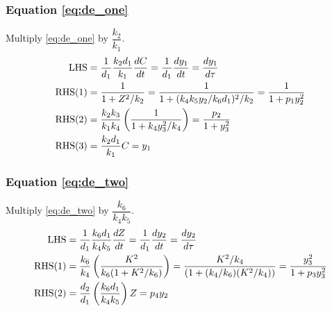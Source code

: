 \documentclass[10pt,letterpaper]{article}
\begin{document}
\subsubsection{Equation \eqref{eq:de_one}}
Multiply \eqref{eq:de_one} by $\dfrac{k_2}{k_1}$.
\begin{equation*}
\begin{gathered}\begin{aligned}
{\rm LHS} &= \frac{1}{d_1} \frac{k_2 d_1}{k_1} \frac{dC}{dt}
           = \frac{1}{d_1} \frac{dy_1}{dt}
           = \frac{dy_1}{d\tau} \\
{\rm RHS(1)} &= \frac{1}{1 + Z^2/k_2}
              = \frac{1}{1 + (k_4 k_5 y_2 / k_6 d_1)^2/k_2}
              = \frac{1}{1 + p_1 y_2^2} \\
{\rm RHS(2)} &= \frac{k_2 k_3}{k_1 k_4} \left( \frac{1}{1 + k_4 y_3^2/k_4} \right)
              = \frac{p_2}{1 + y_3^2}  \\
{\rm RHS(3)} &= \frac{k_2 d_1}{k_1} C = y_1
\end{aligned}\end{gathered}
\end{equation*}

\subsubsection{Equation \eqref{eq:de_two}}
Multiply \eqref{eq:de_two} by $\dfrac{k_6}{k_4 k_5}$.
\begin{equation*}
\begin{gathered}\begin{aligned}
{\rm LHS} &= \frac{1}{d_1} \frac{k_6 d_1}{k_4 k_5} \frac{dZ}{dt}
           = \frac{1}{d_1} \frac{dy_2}{dt}
           = \frac{dy_2}{d\tau} \\
{\rm RHS(1)} &= \frac{k_6}{k_4} \left( \frac{K^2}{k_6(1 + K^2/k_6)} \right)
              = \frac{K^2/k_4}{(1 + (k_4/k_6)(K^2/k_4))}
              = \frac{y_3^2}{1 + p_3 y_3^2} \\
{\rm RHS(2)} &= \frac{d_2}{d_1}\left(\frac{k_6 d_1}{k_4 k_5}\right) Z
              = p_4 y_2
\end{aligned}\end{gathered}
\end{equation*}
\end{document}
